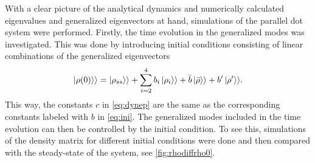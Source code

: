 \documentclass[../main.tex]{subfiles}
\begin{document}
With a clear picture of the analytical dynamics and numerically calculated eigenvalues and generalized eigenvectors at hand, simulations of the parallel dot system were performed. Firstly, the time evolution in the generalized modes was investigated. This was done by introducing initial conditions consisting of linear combinations of the generalized eigenvectors
\begin{equation}\label{eq:ini}
    \ket{\rho(0)}\rangle = \ket{\rho_{ss}}\rangle + \sum_{i=2}^4 b_i\ket{\rho_i}\rangle + \bar b \ket{\bar\rho}\rangle + b'\ket{\rho'}\rangle.
\end{equation}
This way, the constants $c$ in \cref{eq:dynep} are the same as the corresponding constants labeled with $b$ in \cref{eq:ini}. The generalized modes included in the time evolution can then be controlled by the initial condition. To see this, simulations of the density matrix for different initial conditions were done and then compared with the steady-state of the system, see \cref{fig:rhodiffrho0}. 
\end{document}
